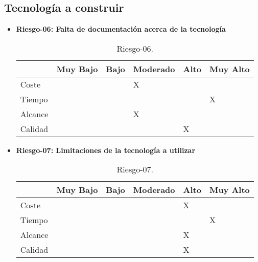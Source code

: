 \subsection{Tecnología a construir}
\begin{itemize}

	\item \textbf{Riesgo-06: Falta de documentación acerca de la tecnología}
	\begin{table}[H]
	\begin{center}
	\begin{tabular}{ l l l l l l }
	\hline
	& Muy Bajo & Bajo & Moderado & Alto & Muy Alto \\ \hline \hline
	Coste &  &  & X & &  \\ \hline
	Tiempo &  &  &  &  & X \\ \hline
	Alcance &  &  & X & &  \\ \hline
	Calidad &  &  &  & X &  \\ \hline
	\end{tabular}
	\caption{Riesgo-06.}
	\label{Riesgo-06}
	\end{center}
	\end{table}
	\item \textbf{Riesgo-07: Limitaciones de la tecnología a utilizar}
	\begin{table}[H]
	\begin{center}
	\begin{tabular}{ l l l l l l }
	\hline
	& Muy Bajo & Bajo & Moderado & Alto & Muy Alto \\ \hline \hline
	Coste &  &  &  & X &  \\ \hline
	Tiempo &  &  &  &  & X \\ \hline
	Alcance &  &  &  & X &  \\ \hline
	Calidad &  &  &  & X &  \\ \hline
	\end{tabular}
	\caption{Riesgo-07.}
	\label{Riesgo-07}
	\end{center}
	\end{table}	
\end{itemize}

